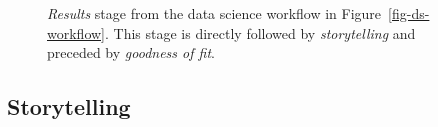 \documentclass[
  letterpaper,
  DIV=11,
  numbers=noendperiod]{scrreprt}
\begin{document}
\begin{figure}


\caption{\label{fig-ds-workflow-results}\emph{Results} stage from the
data science workflow in Figure~\ref{fig-ds-workflow}. This stage is
directly followed by \emph{storytelling} and preceded by \emph{goodness
of fit}.}

\end{figure}%

\subsection{Storytelling}\label{sec-ds-workflow-storytelling}
\end{document}
